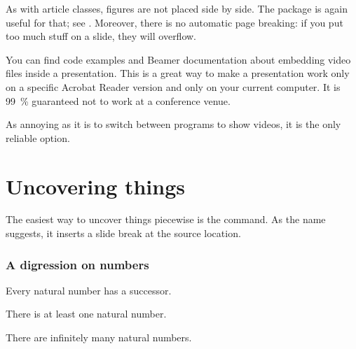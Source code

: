 \begin{gotcha}
As with article classes, figures are not placed side by side.
The  package is again useful for that;
see .
Moreover, there is no automatic page breaking:
if you put too much stuff on a slide, they will overflow.
\end{gotcha}




\begin{warning}
You can find code examples and Beamer documentation about embedding video files inside a presentation.
This is a great way to make a presentation work only on a specific Acrobat Reader version
and only on your current computer.
It is 99~\% guaranteed not to work at a conference venue.

As annoying as it is to switch between programs to show videos,
it is the only reliable option.
\end{warning}



%
%
\section{Uncovering things}

The easiest way to uncover things piecewise is the  command.
As the name suggests, it inserts a slide break at the source location.
%
\begin{ExampleCode}
\begin{frame}
\frametitle{A digression on numbers}

\begin{theorem}
Every natural number has a successor.
\end{theorem}

\pause

\begin{theorem}
There is at least one natural number.
\end{theorem}

\pause

\begin{corollary}
There are infinitely many natural numbers.
\end{corollary}
\end{frame}
\end{ExampleCode}
%
\begin{center}
~
~
\end{center}

